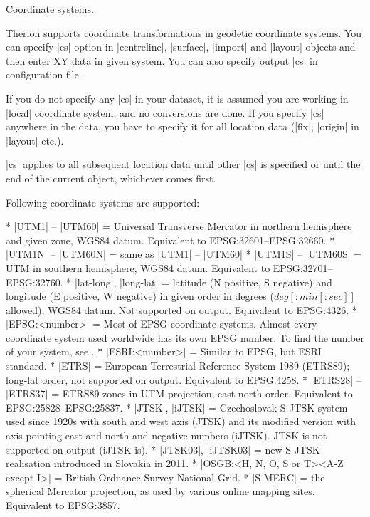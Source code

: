 \subchapter Coordinate systems.

Therion supports coordinate transformations in geodetic coordinate systems.
You can specify |cs| option in |centreline|, |surface|, |import| and
|layout| objects and then enter XY data in given system.
You can also specify output |cs| in configuration file.

If you do not specify any |cs| in your dataset,
it is assumed you are working in |local| coordinate system, and no
conversions are done. If you specify |cs| anywhere in the data, you have to
specify it for all location data (|fix|, |origin| in |layout| etc.).

|cs| applies to all subsequent location data until other |cs| is specified or
until the end of the current object, whichever comes first.

Following coordinate systems are supported:

\list
* |UTM1| -- |UTM60| = Universal Transverse Mercator in northern hemisphere
  and given zone, WGS84 datum. Equivalent to EPSG:32601--EPSG:32660.
* |UTM1N| -- |UTM60N| = same as |UTM1| -- |UTM60|
* |UTM1S| -- |UTM60S| = UTM in southern hemisphere, WGS84 datum.\hfil\break
  Equivalent to EPSG:32701--EPSG:32760.
* |lat-long|, |long-lat| = latitude (N positive, S negative) and
  longitude (E positive, W negative) in given order in degrees
  ($deg[{:}min[{:}sec]]$ allowed), WGS84 datum. Not
  supported on output. Equivalent to EPSG:4326.
* |EPSG:<number>| = Most of EPSG coordinate systems. Almost every
  coordinate system used worldwide has its own EPSG number. To find
  the number of your system, see .
* |ESRI:<number>| = Similar to EPSG, but ESRI standard.
* |ETRS| = European Terrestrial Reference System 1989 (ETRS89); long-lat order,
  not supported on output. Equivalent to EPSG:4258.
* |ETRS28| -- |ETRS37| = ETRS89 zones in UTM projection; east-north order.
  Equivalent to EPSG:25828--EPSG:25837.
* |JTSK|, |iJTSK| = Czechoslovak S-JTSK system used since 1920s with south and west
  axis (JTSK) and its modified version with axis
  pointing east and north and negative numbers (iJTSK). JTSK is
  not supported on output (iJTSK is).
* |JTSK03|, |iJTSK03| = new S-JTSK realisation introduced in Slovakia in 2011.
* |OSGB:<H, N, O, S or T><A-Z except I>| = British Ordnance Survey National
  Grid.
* |S-MERC| = the spherical Mercator projection, as used by various online mapping sites.
  Equivalent to EPSG:3857.
\endlist

